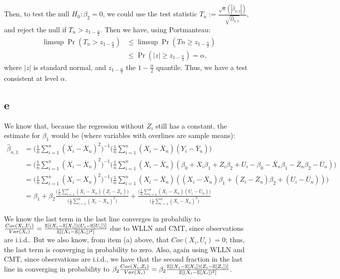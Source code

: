 \documentclass[12pt]{paper}
\begin{document}
Then, to test the null $H_0: \beta_2=0$, we could use the test statistic $T_n:=\frac{\sqrt{n}(|\hat{\beta}_{n,2}|)}{\sqrt{\hat{\Omega}_{3,3}}}$, and reject the null if $T_n>z_{1-\frac{\alpha}{2}}$. Then we have, using Portmanteau:
\begin{equation}
\begin{split}
\limsup{\Pr(T_n>z_{1-\frac{\alpha}{2}})}&\le \limsup{\Pr(Tn\ge z_{1-\frac{\alpha}{2}})}\\
&\le \Pr(|z|\ge z_{1-\frac{\alpha}{2}})=\alpha,
\end{split}
\end{equation}
\noindent where $|z|$ is standard normal, and $z_{1-\frac{\alpha}{2}}$ the $1-\frac{\alpha}{2}$ quantile. Thus, we have a test consistent at level $\alpha$.

\subsection*{e}

We know that, because the regression without $Z_i$ still has a constant, the estimate for $\beta_1$ would be (where variables with overlines are sample means):
\begin{equation}
\begin{split}
\hat{\beta}_{n,1}&=\big(\frac{1}{n}\sum_{i=1}^{n}{(X_i-\overline{X}_n)^2}\big)^{-1}\big(\frac{1}{n}\sum_{i=1}^{n}{(X_i-\overline{X}_n)(Y_i-\overline{Y}_n)}\big)\\
&=\big(\frac{1}{n}\sum_{i=1}^{n}{(X_i-\overline{X}_n)^2}\big)^{-1}\big(\frac{1}{n}\sum_{i=1}^{n}{(X_i-\overline{X}_n)(\beta_0+X_i\beta_1+Z_i\beta_2+U_i-\beta_0-\overline{X}_n\beta_1-\overline{Z}_n\beta_2-\overline{U}_n)}\big)\\
&=\big(\frac{1}{n}\sum_{i=1}^{n}{(X_i-\overline{X}_n)^2}\big)^{-1}\big(\frac{1}{n}\sum_{i=1}^{n}{(X_i-\overline{X}_n)((X_i-\overline{X}_n)\beta_1+(Z_i-\overline{Z}_n)\beta_2+(U_i-\overline{U}_n))}\big)\\
&=\beta_1+\beta_2\frac{\big(\frac{1}{n}\sum_{i=1}^{n}{(X_i-\overline{X}_n)(Z_i-\overline{Z}_n)}\big)}{\big(\frac{1}{n}\sum_{i=1}^{n}{(X_i-\overline{X}_n)^2}\big)}+\frac{\big(\frac{1}{n}\sum_{i=1}^{n}{(X_i-\overline{X}_n)(U_i-\overline{U}_n)}\big)}{\big(\frac{1}{n}\sum_{i=1}^{n}{(X_i-\overline{X}_n)^2}\big)}
\end{split}
\end{equation}

We know the last term in the last line converges in probabiliy to $\frac{Cov(X_i,U_i)}{Var(X_i)}=\frac{\mathbb{E} \left [ (X_i-\mathbb{E} \left [ X_i \right ])(U_i-\mathbb{E} \left [ U_i \right ]) \right ]}{\mathbb{E} \left [ (X_i-\mathbb{E} \left [ X_i \right ])^2 \right ]}$ due to WLLN and CMT, since observations are i.i.d.. But we also know, from item (a) above, that $Cov(X_i,U_i)=0$; thus, the last term is converging in probability to zero. Also, again using WLLN and CMT, since observations are i.i.d., we have that the second fraction in the last line in converging in probability to $\beta_2\frac{Cov(X_i,Z_i)}{Var(X_i)}=\beta_2\frac{\mathbb{E} \left [ (X_i-\mathbb{E} \left [ X_i \right ])(Z_i-\mathbb{E} \left [ Z_i \right ]) \right ]}{\mathbb{E} \left [ (X_i-\mathbb{E} \left [ X_i \right ])^2 \right ]}$.
\end{document}
